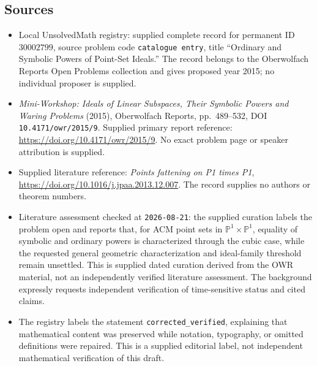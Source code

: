 \documentclass[11pt]{article}
\newcommand{\PP}{\mathbb{P}}
\begin{document}
\subsection{Sources}
\begin{itemize}
\item Local UnsolvedMath registry: supplied complete record for permanent ID \(30002799\), source problem code \texttt{catalogue entry}, title ``Ordinary and Symbolic Powers of Point-Set Ideals.'' The record belongs to the Oberwolfach Reports Open Problems collection and gives proposed year 2015; no individual proposer is supplied.
\item \emph{Mini-Workshop: Ideals of Linear Subspaces, Their Symbolic Powers and Waring Problems} (2015), Oberwolfach Reports, pp.~489--532, DOI \texttt{10.4171/owr/2015/9}. Supplied primary report reference: \url{https://doi.org/10.4171/owr/2015/9}. No exact problem page or speaker attribution is supplied.
\item Supplied literature reference: \emph{Points fattening on P1 times P1}, \url{https://doi.org/10.1016/j.jpaa.2013.12.007}. The record supplies no authors or theorem numbers.
\item Literature assessment checked at \texttt{2026-08-21}: the supplied curation labels the problem open and reports that, for ACM point sets in \(\PP^1\times\PP^1\), equality of symbolic and ordinary powers is characterized through the cubic case, while the requested general geometric characterization and ideal-family threshold remain unsettled. This is supplied dated curation derived from the OWR material, not an independently verified literature assessment. The background expressly requests independent verification of time-sensitive status and cited claims.
\item The registry labels the statement \texttt{corrected\_verified}, explaining that mathematical content was preserved while notation, typography, or omitted definitions were repaired. This is a supplied editorial label, not independent mathematical verification of this draft.
\end{itemize}
\end{document}

